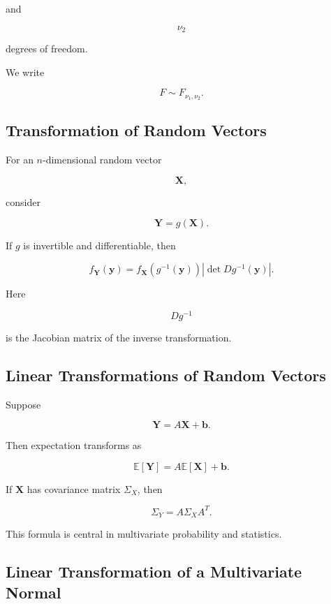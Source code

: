 and

\[
\nu_2
\]

degrees of freedom.

We write

\[
\boxed{
F\sim F_{\nu_1,\nu_2}.
}
\]

\subsection{Transformation of Random Vectors}
\label{subsec:random-vector-transformations}

For an \(n\)-dimensional random vector

\[
\mathbf{X},
\]

consider

\[
\mathbf{Y}
=
g(\mathbf{X}).
\]

If \(g\) is invertible and differentiable, then

\[
\boxed{
f_{\mathbf{Y}}(\mathbf{y})
=
f_{\mathbf{X}}
(g^{-1}(\mathbf{y}))
\left|
\det
Dg^{-1}(\mathbf{y})
\right|.
}
\]

Here

\[
Dg^{-1}
\]

is the Jacobian matrix of the inverse transformation.

\subsection{Linear Transformations of Random Vectors}
\label{subsec:linear-transform-random-vectors}

Suppose

\[
\mathbf{Y}
=
A\mathbf{X}+\mathbf{b}.
\]

Then expectation transforms as

\[
\boxed{
\mathbb{E}[\mathbf{Y}]
=
A\mathbb{E}[\mathbf{X}]
+
\mathbf{b}.
}
\]

If \(\mathbf{X}\) has covariance matrix \(\Sigma_X\), then

\[
\boxed{
\Sigma_Y
=
A\Sigma_XA^T.
}
\]

This formula is central in multivariate probability and statistics.

\subsection{Linear Transformation of a Multivariate Normal}
\label{subsec:linear-transform-multivariate-normal}

